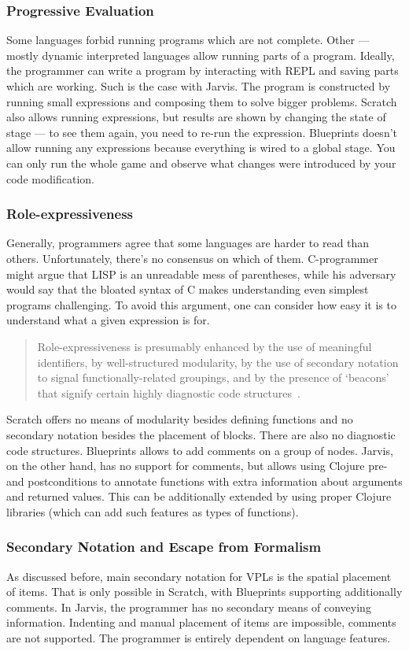 \documentclass[11pt]{scrartcl}
\begin{document}
\subsubsection{Progressive Evaluation}
Some languages forbid running programs which are not complete.
Other --- mostly dynamic interpreted languages allow running parts of a program.
Ideally, the programmer can write a program by interacting with REPL and saving
parts which are working.
Such is the case with Jarvis.
The program is constructed by running small expressions and composing them to
solve bigger problems.
Scratch also allows running expressions, but results are shown by changing the
state of stage --- to see them again, you need to re-run the expression.
Blueprints doesn’t allow running any expressions because everything is wired to
a global stage.
You can only run the whole game and observe what changes were introduced by your
code modification.

\subsubsection{Role-expressiveness}
Generally, programmers agree that some languages are harder to read than others.
Unfortunately, there’s no consensus on which of them.
C-programmer might argue that LISP is an unreadable mess of parentheses, while
his adversary would say that the bloated syntax of C makes understanding even
simplest programs challenging.
To avoid this argument, one can consider how easy it is to understand what a
given expression is for.

\blockquote{Role-expressiveness is presumably
  enhanced by the use of meaningful identifiers, by well-structured modularity,
  by the use of secondary notation to signal functionally-related groupings, and
  by the presence of ‘beacons’ that signify certain highly diagnostic code
  structures~\cite{Green96UsabilityAnalysis}.}

Scratch offers no means of modularity besides defining functions and no
secondary notation besides the placement of blocks.
There are also no diagnostic code structures.
Blueprints allows to add comments on a group of nodes.
Jarvis, on the other hand, has no support for comments, but allows using
Clojure pre- and postconditions to annotate functions with extra information
about arguments and returned values.
This can be additionally extended by using proper Clojure libraries (which can
add such features as types of functions).

\subsubsection{Secondary Notation and Escape from Formalism}
As discussed before, main secondary notation for VPLs is the spatial placement
of items.
That is only possible in Scratch, with Blueprints supporting additionally
comments.
In Jarvis, the programmer has no secondary means of conveying information.
Indenting and manual placement of items are impossible, comments are not
supported.
The programmer is entirely dependent on language features.
\end{document}

